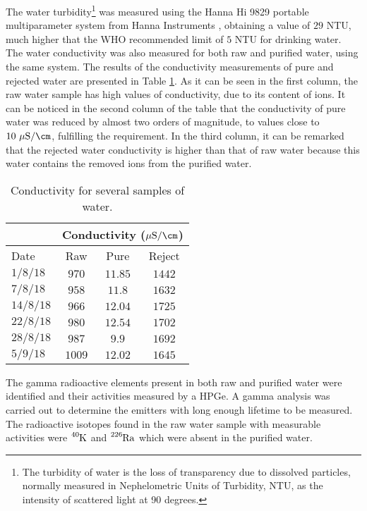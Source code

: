 The water turbidity\footnote{The turbidity of water is the loss of transparency due to dissolved particles, normally measured in Nephelometric Units of Turbidity, NTU, as the intensity of scattered light at 90 degrees.} was measured using the Hanna Hi 9829 portable multiparameter system from Hanna Instruments \cite{TurbiditySystem}, obtaining a value of $29$ NTU, much higher that the WHO recommended limit of $5$ NTU for drinking water. The water conductivity was also measured for both raw and purified water, using the same system. The results of the conductivity measurements of pure and rejected water are presented in Table \ref{tab:ConductivityValues}. As it can be seen in the first column, the raw water sample has high values of conductivity, due to its content of ions. It can be noticed in the second column of the table that the conductivity of pure water was reduced by almost two orders of magnitude, to values close to $10~\mu\text{S}/\cm$, fulfilling the requirement. In the third column, it can be remarked that the rejected water conductivity is higher than that of raw water because this water contains the removed ions from the purified water.


\begin{table}[htbp]
\centering{}%
\begin{tabular}{lccc}
\toprule 
& \multicolumn{3}{c}{Conductivity ($\mu\text{S}/\cm$)} \tabularnewline
\midrule
Date & Raw & Pure & Reject \tabularnewline
\midrule
\midrule 
$1/8/18$ & $970$ & $11.85$ & $1442$ \tabularnewline
$7/8/18$ & $958$ & $11.8$ & $1632$ \tabularnewline
$14/8/18$ & $966$ & $12.04$ & $1725$ \tabularnewline
$22/8/18$ & $980$ & $12.54$ & $1702$ \tabularnewline
$28/8/18$ & $987$ & $9.9$ & $1692$ \tabularnewline
$5/9/18$ & $1009$ & $12.02$ & $1645$ \tabularnewline
\bottomrule
\end{tabular}
\caption{Conductivity for several samples of water.}
\label{tab:ConductivityValues}
\end{table}

The gamma radioactive elements present in both raw and purified water were identified and their activities measured by a HPGe. A gamma analysis was carried out to determine the emitters with long enough lifetime to be measured. The radioactive isotopes found in the raw water sample with measurable activities were $\ce{^{40}K}$ and $\ce{^{226}Ra}$ which were absent in the purified water.


